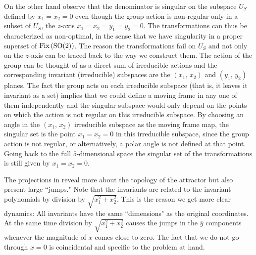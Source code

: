 On the other hand observe that the denominator is singular on
the subspace $U_S$ defined by $x_1=x_2=0$ even though the
group action is non-regular only in a subset of $U_S$, the
$z$-axis $x_1=x_2=y_1=y_2=0$. The transformations
 can thus be characterized as
non-optimal, in the sense that we have singularity in a
proper superset of $\mathrm{Fix}\left(\mathrm{SO}(2)\right)$. The reason the
transformations fail on $U_S$ and not only on the $z$-axis
can be traced back to the way we construct them. The action
of the group can be thought of as a direct sum of irreducible
actions and the corresponding invariant (irreducible)
subspaces are the $(x_1,\,x_2)$ and $(y_1,\,y_2)$
planes.
The
fact the group acts on each irreducible subspace (that is, it
leaves it invariant as a set) implies that we could define a
moving frame in any one of them independently and the
singular subspace would only depend on the points on which
the action is not regular on this irreducible subspace. By
choosing an angle in the $(x_1,\,x_2)$ irreducible subspace
as the moving frame map, the singular set is the point
$x_1=x_2=0$ in this irreducible subspace, since the group
action is not regular, or alternatively, a polar
angle is not defined at that point. Going back to the full
$5$-dimensional space the singular set of the transformations
is still given by $x_1=x_2=0$.

The projections in  reveal more about the
topology of the attractor but also present large ``jumps." Note that
the invariants  are related to the invariant polynomials 
by division by $\sqrt{x_1^2+x_2^2}$. This is the
reason we get more clear dynamics: All invariants have the same
``dimensions" as the original coordinates. At the same time division by $\sqrt{x_1^2+x_2^2}$
causes the jumps in the $\overline{y}$ components whenever the magnitude of $x$ comes close to zero.
The fact that we do not go through $x=0$ is coincidental and specific to the problem
at hand.

